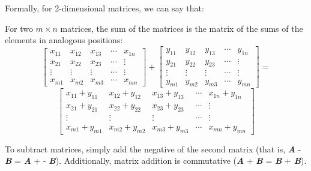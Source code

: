 Formally, for 2-dimensional matrices, we can say that:
\begin{mdframed}[style = important, frametitle={Adding and Subtracting Matrics}]
For two $m \times n$ matrices, the sum of the matrices is the matrix of the 
sums of the elements in analogous positions:
$$\begin{bmatrix}
x_{11} & x_{12} & x_{13} & \cdots & x_{1n}\\
x_{21} & x_{22} & x_{23} & \cdots & \vdots\\
\vdots & \vdots & \vdots & \cdots & \vdots\\
x_{m1} & x_{m2} & x_{m3} & \cdots & x_{mn}
\end{bmatrix}
+ \begin{bmatrix}
y_{11} & y_{12} & y_{13} & \cdots & y_{1n}\\
y_{21} & y_{22} & y_{23} & \cdots & \vdots\\
\vdots & \vdots & \vdots & \cdots & \vdots\\
y_{m1} & y_{m2} & y_{m3} & \cdots & y_{mn}
\end{bmatrix} = $$
$$\begin{bmatrix}
x_{11} + y_{11} & x_{12} + y_{12} & x_{13} + y_{13} & \cdots & x_{1n} + y_{1n}\\
x_{21} + y_{21} & x_{22} + y_{22} & x_{23} + y_{23} & \cdots & \vdots\\
\vdots & \vdots & \vdots & \cdots & \vdots\\
x_{m1} + y_{m1} & x_{m2} + y_{m2} & x_{m3} + y_{m3} & \cdots & x_{mn} + y_{mn}
\end{bmatrix}$$

To subtract matrices, simply add the negative of the second matrix (that is, 
\textbf{\textit{A}} - \textbf{\textit{B}} = \textbf{\textit{A}} + -\textbf{
\textit{B}}). Additionally, matrix addition is commutative (\textbf{\textit{A}}
+ \textbf{\textit{B}} = \textbf{\textit{B}} + \textbf{\textit{B}}).
\end{mdframed}

